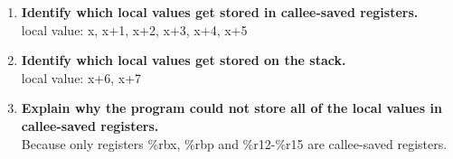 \documentclass{article}
\begin{document}
\begin{enumerate}[label=\textbf{\Alph*.}]
	\item \textbf{Identify which local values get stored in callee-saved registers.} \\
	local value: x, x+1, x+2, x+3, x+4, x+5
	\item \textbf{Identify which local values get stored on the stack.} \\
	local value: x+6, x+7
	\item \textbf{Explain why the program could not store all of the local values in callee-saved
	registers.} \\
	Because only registers \%rbx, \%rbp and \%r12-\%r15 are callee-saved registers.
\end{enumerate}
\end{document}
